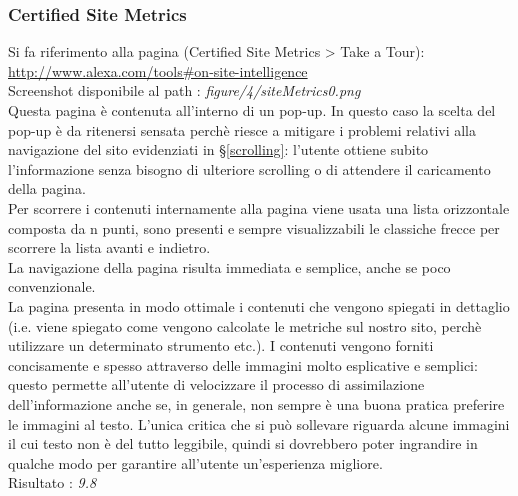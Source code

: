 \subsubsection{Certified Site Metrics}\label{metrics}
Si fa riferimento alla pagina (Certified Site Metrics > Take a Tour): \\
\url{http://www.alexa.com/tools#on-site-intelligence}
\\
Screenshot disponibile al path : \textit{figure/4/siteMetrics0.png} \\ 
Questa pagina è contenuta all'interno di un pop-up.
In questo caso la scelta del pop-up è da ritenersi sensata perchè riesce a 
mitigare i problemi relativi alla navigazione del sito evidenziati in 
§\ref{scrolling}: l'utente ottiene subito l'informazione senza
bisogno di ulteriore scrolling o di attendere il caricamento della pagina.\\
Per scorrere i contenuti internamente alla pagina viene usata una lista
 orizzontale composta da n punti, sono presenti e sempre
visualizzabili le classiche frecce per scorrere la lista avanti e indietro. \\
La navigazione della pagina risulta immediata e semplice, anche se poco
convenzionale. \\
La pagina presenta in modo ottimale i contenuti che vengono spiegati in 
dettaglio (i.e. viene spiegato come vengono calcolate le metriche sul
nostro sito, perchè utilizzare un determinato strumento etc.). I contenuti vengono
forniti concisamente e spesso attraverso delle immagini molto esplicative e
semplici: questo permette all'utente di velocizzare il processo di assimilazione
dell'informazione anche se, in generale, non sempre è una buona pratica 
preferire le immagini al testo. L'unica critica che si può sollevare riguarda
alcune immagini il cui testo non è del tutto leggibile, quindi si dovrebbero
poter ingrandire in qualche modo per garantire all'utente un'esperienza migliore.
 \\
Risultato : \textit{9.8}